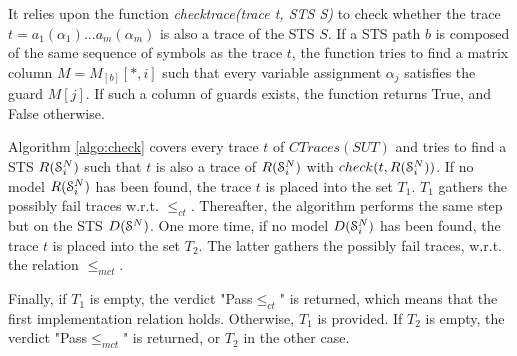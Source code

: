 It relies upon the function \textit{checktrace(trace t, STS S)} to check
whether the trace $t=a_1(\alpha_1)...a_m(\alpha_m)$ is also a
trace of the STS $S$. If a STS path $b$ is composed of the same sequence of
symbols as the trace $t$, the function tries to find a matrix
column  $M=M_{[b]}[*,i]$ such that every variable assignment $\alpha_j$
satisfies the guard $M[j]$. If such a column of guards exists,
the function returns True, and False otherwise.

Algorithm \ref{algo:check} covers every trace $t$ of
$CTraces({SUT})$ and tries to find a STS $R(\EuScript{S}_i^{N})$
such that $t$ is also a trace of $R(\EuScript{S}_i^{N})$ with
$check(t, R(\EuScript{S}_i^{N}))$.  If no model
$R(\EuScript{S}_i^{N})$ has been found, the trace $t$ is placed
into the set $T_1$. $T_1$ gathers the possibly fail traces
w.r.t. $\leq_{ct}$. Thereafter, the algorithm performs the same
step but on the STS $D(\EuScript{S}^{N})$. One more time, if no
model $D(\EuScript{S}_i^{N})$ has been found, the trace $t$ is placed
into the set $T_2$.  The latter gathers the possibly fail traces,
w.r.t. the relation $\leq_{mct}$.

Finally, if $T_1$ is empty, the verdict "Pass$\leq_{ct}$" is
returned, which means that the first implementation relation holds.
Otherwise, $T_1$ is provided. If $T_2$ is empty, the verdict
"Pass$\leq_{mct}$" is returned, or $T_2$ in the other case.

